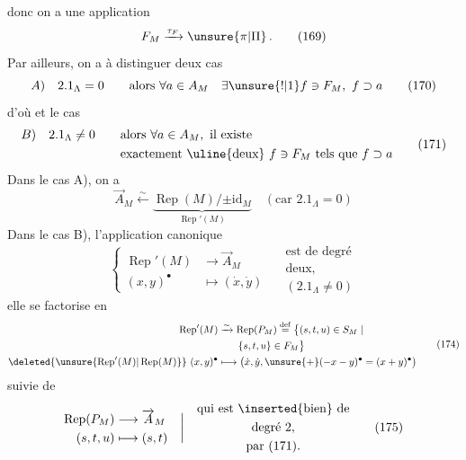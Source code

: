 donc on a une application
\[
 F_M\xrightarrow{\tau_F}\unsure{\pi|\Pi}\,.\tag*{(169)}
\]
Par ailleurs, on a à distinguer deux cas
\[
 A)\quad 2.1_\Lambda=0\qquad\text{alors }\forall a\in A_M\quad\exists\unsure{!|1} f\ni F_M,\ f\supset a\tag*{(170)}
\]
 d'où
et le cas
\[
\begin{aligned} B)\quad 2.1_\Lambda\ne0\qquad &\text{alors }\forall a\in A_M,\text{ il existe}\\
 &\text{exactement \uline{deux} }f\ni F_M\ \text{tels que }f\supset a
\end{aligned}\tag*{(171)}
\]
Dans le cas A), on a
\[
 \overrightarrow A_M\xleftarrow{\sim}\underbrace{\operatorname{Rep}(M)/{\pm\mathrm{id}_M}}_{\operatorname{Rep}'(M)}
 \quad(\text{car }2.1_\Lambda=0)\tag*{(172)}
\]
Dans le cas B), l'application canonique
\[
 \left\{\begin{aligned}\operatorname{Rep}'(M)&\longrightarrow\overrightarrow A_M\\
 (x,y)^{\bullet}&\longmapsto(\dot x,\dot y)\end{aligned}\right.
 \quad\begin{gathered}\text{est de degré}\\\text{deux,}\\(2.1_\Lambda\ne0)\end{gathered}\tag*{(173)}
\]
elle se factorise en
\[
\begin{aligned}
 \operatorname{Rep}'(M)&\xrightarrow{\sim}\operatorname{Rep}(P_M)\overset{\mathrm{def}}{=}
 \bigl\{(s,t,u)\in S_M\mid\\
 &\qquad\{s,t,u\}\in F_M\bigr\}\\
 \deleted{\unsure{\operatorname{Rep}'(M)|\operatorname{Rep}(M)}}\ (x,y)^{\bullet}&\longmapsto
 \bigl(\dot x,\dot y,\unsure{+}(-x-y)^{\bullet}=(x+y)^{\bullet}\bigr)
\end{aligned}\tag*{(174)}
\]
suivie de
\[
 \begin{aligned}\operatorname{Rep}(P_M)&\longrightarrow\overrightarrow A_M\\
 (s,t,u)&\longmapsto(s,t)\end{aligned}\quad\bigg|\quad
 \begin{gathered}\text{qui est \inserted{bien} de}\\\text{degré }2,\\\text{par (171).}\end{gathered}\tag*{(175)}
\]
